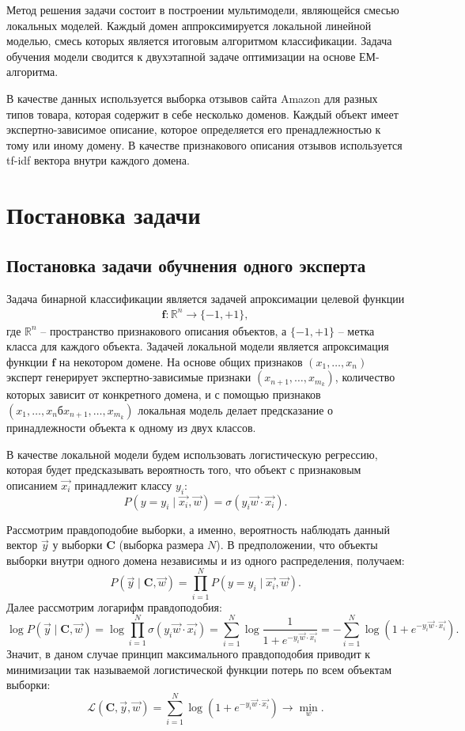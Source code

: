 \documentclass[12pt, twoside]{article}
\begin{document}
Метод решения задачи состоит в построении мультимодели, являющейся смесью локальных моделей. Каждый домен аппроксимируется локальной линейной моделью, смесь которых является итоговым алгоритмом классификации. Задача обучения модели сводится к двухэтапной задаче оптимизации на основе ЕМ-алгоритма.

В качестве данных используется выборка отзывов сайта Amazon для разных типов товара, которая содержит в себе несколько доменов. Каждый объект имеет экспертно-зависимое описание, которое определяется его пренадлежностью к тому или иному домену. В качестве признакового описания отзывов используется tf-idf вектора внутри каждого домена. 


\section{Постановка задачи}
\subsection{Постановка задачи обучнения одного эксперта}
Задача бинарной классификации является задачей апроксимации целевой функции
\[
\label{eq:st:1.1}
\begin{aligned}
\mathbf{f}: \mathbb{R}^n \to \{-1, +1\},
\end{aligned}
\]
где $\mathbb{R}^n$ -- пространство признакового описания объектов, а $\{-1, +1\}$ -- метка класса для каждого объекта. Задачей локальной модели является апроксимация функции $\mathbf{f}$ на некотором домене. На основе общих признаков $(x_1, \ldots, x_n)$ эксперт генерирует экспертно-зависимые признаки $(x_{n+1}, \ldots, x_{m_k})$, количество которых зависит от конкретного домена, и с помощью признаков $(x_1, \ldots, x_nб x_{n+1}, \ldots, x_{m_k})$ локальная модель делает предсказание о принадлежности объекта к одному из двух классов.

В качестве локальной модели будем использовать логистическую регрессию, которая будет предсказывать вероятность того, что объект с признаковым описанием $\vec{x_i}$ принадлежит классу $y_i$:
\[P\left(y = y_i \mid \vec{x_i}, \vec{w}\right) = \sigma(y_i\vec{w} \cdot \vec{x_i}).\]

Рассмотрим правдоподобие выборки, а именно, вероятность наблюдать данный вектор $\vec{y}$ у выборки $\textbf{C}$ (выборка размера $N$). В предположении, что объекты выборки внутри одного домена независимы и из одного распределения, получаем:
\[P \left(\vec{y} \mid \textbf{C}, \vec{w}\right) = \prod_{i=1}^{N} P\left(y = y_i \mid \vec{x_i}, \vec{w}\right).\]
Далее рассмотрим логарифм правдоподобия:
\[\log P\left(\vec{y} \mid \textbf{C}, \vec{w}\right) = \log \prod_{i=1}^{N} \sigma(y_i\vec{w} \cdot \vec{x_i}) = \sum_{i=1}^{N} \log \frac{1}{1 + e^{-y_i\vec{w} \cdot \vec{x_i}}} = - \sum_{i=1}^{N} \log (1 + e^{-y_i\vec{w} \cdot \vec{x_i}}).\]
Значит, в даном случае принцип максимального правдоподобия приводит к минимизации так называемой логистической функции потерь по всем объектам выборки:
\[\mathcal{L} (\textbf{C}, \vec{y}, \vec{w}) = \sum_{i=1}^{N} \log (1 + e^{-y_i\vec{w} \cdot \vec{x_i}}) \to \min_w.\]
\end{document}
